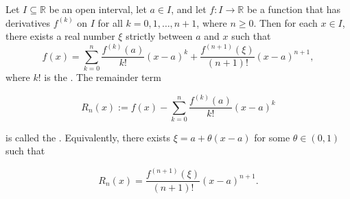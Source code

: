 \begin{theorem} \label{theorem:taylor_formula_with_lagrange_remainder_for_real_functions}
    Let $I \subseteq \mathbb{R}$ be an open interval, let $a \in I$, and let $f : I \to \mathbb{R}$ be a function that has derivatives $f^{(k)}$ on $I$ for all $k = 0, 1, \dots, n+1$, where $n \geq 0$. Then for each $x \in I$, there exists a real number $\xi$ strictly between $a$ and $x$ such that
    $$f(x) = \sum_{k=0}^n \frac{f^{(k)}(a)}{k!}(x - a)^k + \frac{f^{(n+1)}(\xi)}{(n+1)!}(x - a)^{n+1},$$
    where $k!$ is the . The remainder term

    $$R_n(x) := f(x) - \sum_{k=0}^n \frac{f^{(k)}(a)}{k!}(x - a)^k$$

    is called the . Equivalently, there exists $\xi = a + \theta(x-a)$ for some $\theta \in (0, 1)$ such that

    $$R_n(x) = \frac{f^{(n+1)}(\xi)}{(n+1)!}(x - a)^{n+1}.$$
\end{theorem}
